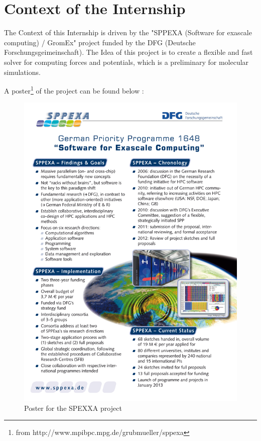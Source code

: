 \documentclass[10pt,twoside,a4paper]{report}
\begin{document}
\chapter{Context of the Internship}

The Context of this Internship is driven by the "SPPEXA (Software for exascale computing) / GromEx" project funded by the DFG (Deutsche Forschungsgeimeinschaft).
The Idea of this project is to create a flexible and fast solver for computing forces and potentials, which is a preliminary for molecular simulations.

A poster\footnote{from http://www.mpibpc.mpg.de/grubmueller/sppexa}   of the project can be found below :

\begin{figure}[H]
\includegraphics[scale=2]{sppexa-poster}
 \centering 
\caption{Poster for the SPEXXA project}
\label{fig:poster}
\end{figure}
\end{document}
